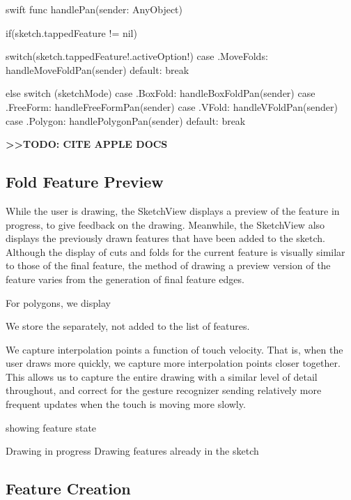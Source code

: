 \small
\singlespacing 

\begin{pygmented}{swift}
    func handlePan(sender: AnyObject) {
        if(sketch.tappedFeature != nil){
            
            switch(sketch.tappedFeature!.activeOption!){
            case .MoveFolds:
                handleMoveFoldPan(sender)
            default: break
            }
        }
        else{
            switch (sketchMode) {
            case .BoxFold:
                handleBoxFoldPan(sender)
            case .FreeForm:
                handleFreeFormPan(sender)
            case .VFold:
                handleVFoldPan(sender)
            case .Polygon:
                handlePolygonPan(sender)
            default:
                break
            }
        }
    }
\end{pygmented}

\doublespacing
\normalsize

\textbf{\textgreater{}\textgreater{}TODO: CITE APPLE DOCS}

\subsection{Fold Feature Preview}\label{fold-feature-preview}

While the user is drawing, the SketchView displays a preview of the
feature in progress, to give feedback on the drawing. Meanwhile, the
SketchView also displays the previously drawn features that have been
added to the sketch. Although the display of cuts and folds for the
current feature is visually similar to those of the final feature, the
method of drawing a preview version of the feature varies from the
generation of final feature edges.

For polygons, we display

We store the separately, not added to the list of features.

We capture interpolation points a function of touch velocity. That is,
when the user draws more quickly, we capture more interpolation points
closer together. This allows us to capture the entire drawing with a
similar level of detail throughout, and correct for the gesture
recognizer sending relatively more frequent updates when the touch is
moving more slowly.

showing feature state

Drawing in progress Drawing features already in the sketch

\subsection{Feature Creation}\label{feature-creation}


